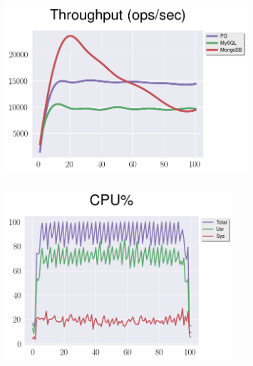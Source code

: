 \documentclass[usenames,dvipsnames, 18pt, compress, aspectratio=169]{beamer}
\begin{document}
\begin{frame}
    \frametitle{}
    \begin{center}
    \vspace{10pt}
    \begin{figure}
        \includegraphics[width=0.8\textwidth,center]{benchmarks/select_jsonb_path_ops_throughput.png}
    \end{figure}
    \end{center}
\end{frame}

\begin{frame}
    \frametitle{}
    \begin{center}
    \vspace{10pt}
    \begin{figure}
        \includegraphics[width=0.75\textwidth,center]{benchmarks/pg_select_cpu_20.png}
    \end{figure}
    \end{center}
\end{frame}
\end{document}
